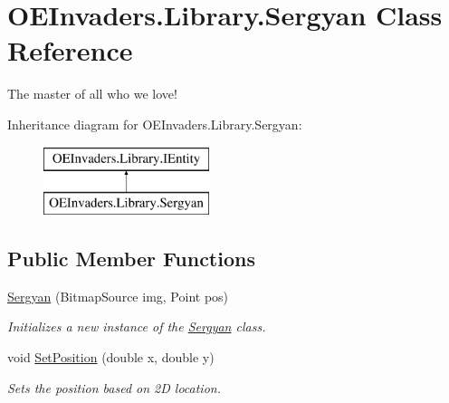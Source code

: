 \hypertarget{class_o_e_invaders_1_1_library_1_1_sergyan}{}\section{O\+E\+Invaders.\+Library.\+Sergyan Class Reference}
\label{class_o_e_invaders_1_1_library_1_1_sergyan}


The master of all who we love!  


Inheritance diagram for O\+E\+Invaders.\+Library.\+Sergyan\+:\begin{figure}[H]
\begin{center}
\leavevmode
\includegraphics[height=2.000000cm]{class_o_e_invaders_1_1_library_1_1_sergyan}
\end{center}
\end{figure}
\subsection*{Public Member Functions}
\begin{DoxyCompactItemize}
\item 
\mbox{\hyperlink{class_o_e_invaders_1_1_library_1_1_sergyan_a2dd55329c3f5ff407372ee7cdcf6f761}{Sergyan}} (Bitmap\+Source img, Point pos)
\begin{DoxyCompactList}\small\item\em Initializes a new instance of the \mbox{\hyperlink{class_o_e_invaders_1_1_library_1_1_sergyan}{Sergyan}} class. \end{DoxyCompactList}\item 
void \mbox{\hyperlink{class_o_e_invaders_1_1_library_1_1_sergyan_a11889323e2933e197f89f40855bc7257}{Set\+Position}} (double x, double y)
\begin{DoxyCompactList}\small\item\em Sets the position based on 2D location. \end{DoxyCompactList}\end{DoxyCompactItemize}
